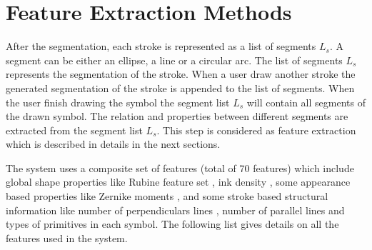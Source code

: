 %
%

\section{Feature Extraction Methods}%
\label{sec:FeatureExtraction}

After the segmentation, each stroke is represented as a list of segments $L_s$. A segment can be either an ellipse, a line or a circular arc. The list of segments $L_s$ represents the segmentation of the stroke. When a user draw another stroke the generated segmentation of the stroke is appended to the list of segments.  When the user finish drawing the symbol the segment list $L_s$ will contain all segments of the drawn symbol. The relation and properties between different segments are extracted from the segment list $L_s$.  This step is considered as feature extraction which is described in details in the next sections. 

The system uses a composite set of features (total of 70 features) which include global shape properties like Rubine feature set \cite{gestureexample12},  ink density \cite{GeometryAndDomain102}, some appearance based properties like Zernike moments \cite{HeloiseBeautification}, and some stroke based structural information like number of perpendiculars lines , number of parallel lines and types of primitives in each symbol. The following list gives details on all the features used in the system.


